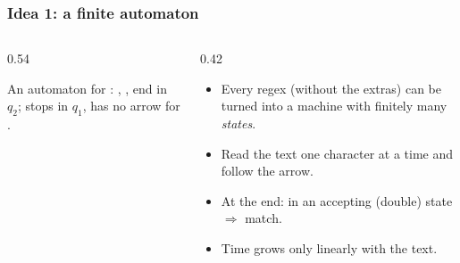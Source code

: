 \documentclass[aspectratio=169,10pt,compress]{beamer}
\begin{document}




\begin{frame}[t,fragile] \frametitle{Idea 1: a finite automaton}
  \begin{columns}[T]
    \begin{column}{0.54\textwidth}
      \begin{center}
      \end{center}
      \small An automaton for : , ,  end in $q_{2}$;  stops in $q_{1}$,  has no arrow for .
    \end{column}
    \begin{column}{0.42\textwidth}
      \begin{itemize}\small
        \item Every regex (without the extras) can be turned into a machine with finitely many \emph{states}.
        \item Read the text one character at a time and follow the arrow.
        \item At the end: in an accepting (double) state $\Rightarrow$ match.
        \item Time grows only linearly with the text.
      \end{itemize}
    \end{column}
  \end{columns}
\end{frame}
\end{document}
